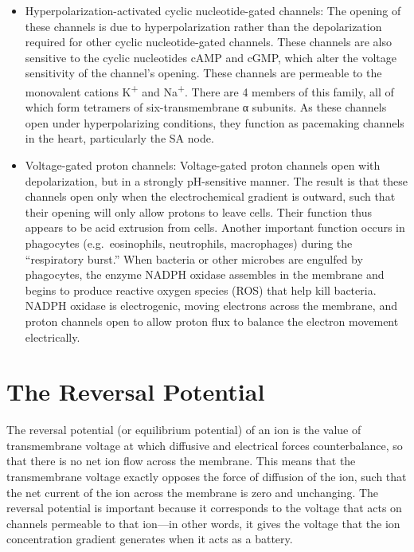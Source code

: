 \begin{itemize}
\item
  Hyperpolarization-activated cyclic nucleotide-gated channels: The opening of these channels is due to hyperpolarization rather than the depolarization required for other cyclic nucleotide-gated channels. These channels are also sensitive to the cyclic nucleotides cAMP and cGMP, which alter the voltage sensitivity of the channel's opening. These channels are permeable to the monovalent cations K\textsuperscript{+} and Na\textsuperscript{+}. There are 4 members of this family, all of which form tetramers of six-transmembrane α subunits. As these channels open under hyperpolarizing conditions, they function as pacemaking channels in the heart, particularly the SA node.
\item
  Voltage-gated proton channels: Voltage-gated proton channels open with depolarization, but in a strongly pH-sensitive manner. The result is that these channels open only when the electrochemical gradient is outward, such that their opening will only allow protons to leave cells. Their function thus appears to be acid extrusion from cells. Another important function occurs in phagocytes (e.g.~eosinophils, neutrophils, macrophages) during the ``respiratory burst.'' When bacteria or other microbes are engulfed by phagocytes, the enzyme NADPH oxidase assembles in the membrane and begins to produce reactive oxygen species (ROS) that help kill bacteria. NADPH oxidase is electrogenic, moving electrons across the membrane, and proton channels open to allow proton flux to balance the electron movement electrically.
\end{itemize}

\hypertarget{the-reversal-potential}{%
\section{The Reversal Potential}\label{the-reversal-potential}}

The reversal potential (or equilibrium potential) of an ion is the value of transmembrane voltage at which diffusive and electrical forces counterbalance, so that there is no net ion flow across the membrane. This means that the transmembrane voltage exactly opposes the force of diffusion of the ion, such that the net current of the ion across the membrane is zero and unchanging. The reversal potential is important because it corresponds to the voltage that acts on channels permeable to that ion---in other words, it gives the voltage that the ion concentration gradient generates when it acts as a battery.

